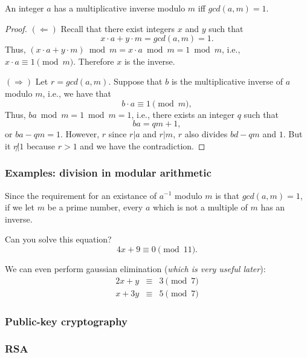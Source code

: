 \begin{frame}
  \begin{theorem}
    An integer $a$ has a multiplicative inverse modulo $m$ iff
    $gcd(a,m) = 1$.
  \end{theorem}
  \begin{proof}
    \pause
    {\footnotesize
    $(\Leftarrow)$ Recall that there exist integers $x$ and $y$ such
    that
    \[
    x\cdot a + y\cdot m = gcd(a,m) = 1.
    \]
    Thus,
    $(x\cdot a + y\cdot m)\bmod m = x\cdot a \bmod m = 1 \bmod m$,
    i.e., $x\cdot a\equiv 1 \pmod m$.  Therefore $x$ is the inverse.

    \pause
    $(\Rightarrow)$ Let $r=gcd(a,m)$.
    Suppose that $b$ is the multiplicative inverse of
    $a$ modulo $m$, i.e., we have that
    \[
    b\cdot a \equiv 1 \pmod m,
    \]
    Thus, $ba \bmod m = 1 \bmod m = 1$, i.e., there exists an integer
    $q$ such that
    \[
    ba = qm + 1,
    \]
    or $ba - qm = 1$.  However, $r$ since $r|a$ and $r|m$, $r$ also
    divides $bd-qm$ and $1$.  But it $r\not|1$ because $r>1$ and we
    have the contradiction.
    }
  \end{proof}
\end{frame}

\begin{frame}
  \frametitle{Examples: division in modular arithmetic}

  Since the requirement for an existance of $a^{-1}$ modulo $m$ is
  that $gcd(a,m)=1$, if we let $m$ be a prime number, every $a$ which
  is not a multiple of $m$ has an inverse.

  Can you solve this equation?
  \[
  4x + 9 \equiv 0 \pmod{11}.
  \]

  \pause

  We can even perform gaussian elimination ({\em which is very useful
    later}):
  \[
  \begin{array}{rcl}
    2x + y & \equiv & 3 \pmod 7 \\
    x + 3y & \equiv & 5 \pmod 7
  \end{array}
  \]
  
\end{frame}

\begin{frame}
  \frametitle{Public-key cryptography}
\end{frame}

\begin{frame}
  \frametitle{RSA}
\end{frame}

